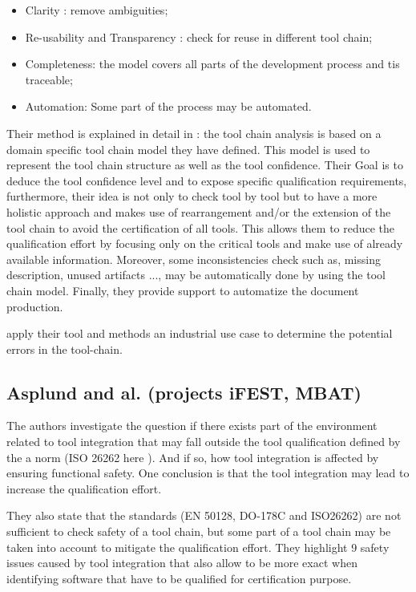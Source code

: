 \documentclass{openetcs_report}
\begin{document}
\begin{itemize}
\item Clarity : remove ambiguities;
\item Re-usability and Transparency : check for reuse in different tool chain;
\item Completeness: the model covers all parts of the  development
  process and tis traceable;
\item Automation: Some part of the process may be automated.
\end{itemize}
Their method is explained in detail in \cite{slotosch_iso_2012}: the
tool chain analysis is based on a domain specific tool chain model
they have defined. This model is used to represent the tool chain
structure as well as the tool confidence.  Their Goal is to deduce the
tool confidence level and to expose specific qualification
requirements, furthermore, their idea is not only to check tool by
tool but to have a more holistic approach and makes use of
rearrangement and/or the extension of the tool chain to avoid the
certification of all tools. This allows them to reduce the
qualification effort by focusing only on the critical tools and make
use of already available information.  Moreover, some inconsistencies
check such as, missing description, unused artifacts ..., may be
automatically done by using the tool chain model. Finally, they
provide support to automatize the document production.

\cite{wildmoser_determining_2012} apply their tool and methods an
industrial use case to determine the potential errors in the tool-chain.

\subsection{Asplund and al. (projects iFEST, MBAT)}
\label{sec-1-2.2}

The authors investigate the question if there exists part of the environment related to tool
integration that may fall outside the tool qualification defined by the a norm
(ISO 26262 here \cite{asplund_qualifying_2012}). And if so, how tool integration
is affected by ensuring functional safety. One conclusion is that the tool
integration may lead to increase the qualification effort.

They also state that the standards (EN 50128, DO-178C and ISO26262)
are not sufficient to check safety of a tool chain, but some part of a
tool chain may be taken into account to mitigate the qualification
effort. 
They highlight 9 safety issues caused by tool integration that also
allow to be more exact when identifying software that have to be
qualified for certification purpose. 
\end{document}
